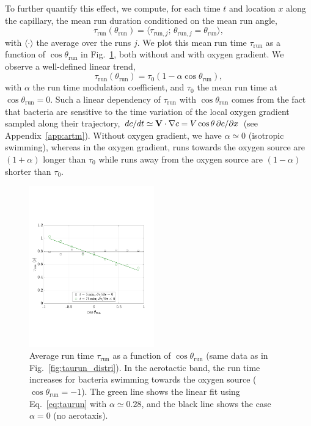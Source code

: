 \documentclass[aps,a4paper,twocolumn,10pt,pre,showpacs]{revtex4-2}
\begin{document}
To further quantify this effect, we compute, for each time $t$ and location $x$ along the capillary, the mean run duration conditioned on the mean run angle,
\begin{equation}
        \tau_{\mathrm{run}}(\theta_{\mathrm{run}}) = \langle  \tau_{\mathrm{run,}j} ; \, \theta_{\mathrm{run,}j} = \theta_{\mathrm{run}} \rangle,
\end{equation}
with $\langle \cdot \rangle$ the average over the runs $j$.
We plot this mean run time $\tau_{\mathrm{run}}$ as a function of $\cos \theta_{\mathrm{run}}$  in Fig.~\ref{fig:taurun}, both without and with oxygen gradient. We observe a well-defined linear trend,
\begin{equation}
     \tau_{\mathrm{run}} (\theta_{\mathrm{run}}) = \tau_0 (1 - \alpha \cos \theta_{\mathrm{run}}),
\label{eq:taurun}
\end{equation}
with $\alpha$ the run time modulation coefficient, and $\tau_0$ the mean run time at $\cos\theta_{\mathrm{run}}=0$. Such a linear dependency of $\tau_{\mathrm{run}} $ with $\cos \theta_{\mathrm{run}}$ comes from the fact that bacteria are sensitive to the time variation of the local oxygen gradient sampled along their trajectory, $d c/d t \simeq {\bf V} \cdot \nabla c = V \cos \theta \, \partial c / \partial x$ (see Appendix~\ref{app:artm}). Without oxygen gradient, we have $\alpha \simeq 0$ (isotropic swimming), whereas in the oxygen gradient, runs towards the oxygen source are $(1+\alpha)$ longer than $\tau_0$ while runs away from the oxygen source are $(1-\alpha)$ shorter than $\tau_0$.


\begin{figure}[b]
\includegraphics[trim = 5mm 56mm 15mm 65mm, clip, width=0.48\textwidth, angle=0]{Fig08.pdf} 
\caption{Average run time $\tau_\mathrm{run}$ as a function of $\cos\theta_\mathrm{run}$ (same data as in Fig.~\ref{fig:taurun_distri}). In the aerotactic band, the run time increases for bacteria swimming towards the oxygen source ($\cos \theta_\mathrm{run}=-1$). The green line shows the linear fit using Eq.~\eqref{eq:taurun} with $\alpha \simeq 0.28$, and the black line shows the case $\alpha=0$ (no aerotaxis).}
\label{fig:taurun}
\end{figure}
\end{document}
